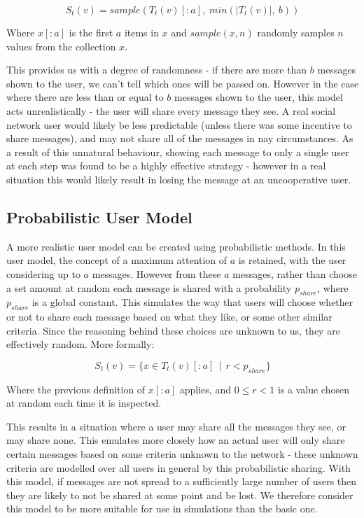 \documentclass[bsc,frontabs,twoside,singlespacing,parskip,deptreport]{infthesis}     %
\begin{document}
\begin{equation}
S_{t}(v) = sample(T_{t}(v)[:a], \; min(|T_{t}(v)|,\: b))
\end{equation}

Where $x[:a]$ is the first $a$ items in $x$ and $sample(x, n)$ randomly samples $n$ values from the collection $x$.

This provides us with a degree of randomness - if there are more than $b$ messages shown to the user, we can't tell which ones will be passed on. However in the case where there are less than or equal to $b$ messages shown to the user, this model acts unrealistically - the user will share every message they see. A real social network user would likely be less predictable (unless there was some incentive to share messages), and may not share all of the messages in nay circumstances. As a result of this unnatural behaviour, showing each message to only a single user at each step was found to be a highly effective strategy - however in a real situation this would likely result in losing the message at an uncooperative user.

\subsection{Probabilistic User Model}
A more realistic user model can be created using probabilistic methods. In this user model, the concept of a maximum attention of $a$ is retained, with the user considering up to $a$ messages. However from these $a$ messages, rather than choose a set amount at random each message is shared with a probability $p_{share}$, where $p_{share}$ is a global constant. This simulates the way that users will choose whether or not to share each message based on what they like, or some other similar criteria. Since the reasoning behind these choices are unknown to us, they are effectively random. More formally:

\begin{equation}
S_{t}(v) = \{x \in T_{t}(v)[:a] \:\: | \:\:  r < p_{share}\}
\end{equation}

Where the previous definition of $x[:a]$ applies, and $0 \leq r < 1$ is a value chosen at random each time it is inspected. 

This results in a situation where a user may share all the messages they see, or may share none. This emulates more closely how an actual user will only share certain messages based on some criteria unknown to the network - these unknown criteria are modelled over all users in general by this probabilistic sharing. With this model, if messages are not spread to a sufficiently large number of users then they are likely to not be shared at some point and be lost. We therefore consider this model to be more suitable for use in simulations than the basic one.
\end{document}
